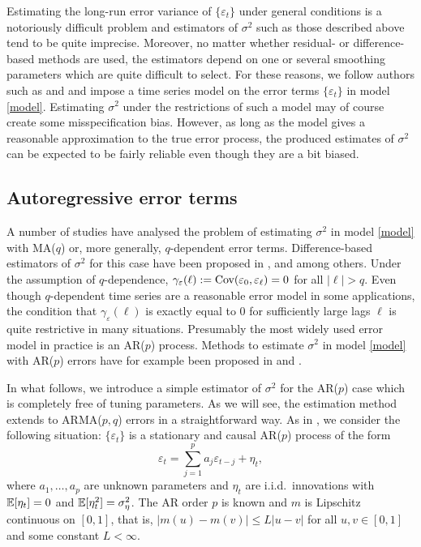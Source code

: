 Estimating the long-run error variance of $\{ \varepsilon_t \}$ under general conditions is a notoriously difficult problem and estimators of $\sigma^2$ such as those described above tend to be quite imprecise. Moreover, no matter whether residual- or difference-based methods are used, the estimators depend on one or several smoothing parameters which are quite difficult to select. For these reasons, we follow authors such as \cite{Hart1991, Hart1994} and \cite{Hall2003} and impose a time series model on the error terms $\{\varepsilon_t\}$ in model \eqref{model}. Estimating $\sigma^2$ under the restrictions of such a model may of course create some misspecification bias. However, as long as the model gives a reasonable approximation to the true error process, the produced estimates of $\sigma^2$ can be expected to be fairly reliable even though they are a bit biased. 


\subsection{Autoregressive error terms}\label{subsec-error-var-ar}


A number of studies have analysed the problem of estimating $\sigma^2$ in model \eqref{model} with MA($q$) or, more generally, $q$-dependent error terms. Difference-based estimators of $\sigma^2$ for this case have been proposed in \cite{MuellerStadtmueller1988}, \cite{Herrmann1992} and \cite{Munk2017} among others. Under the assumption of $q$-dependence, $\gamma_\varepsilon(\ell) := \textnormal{Cov}(\varepsilon_0,\varepsilon_{\ell}) = 0$ for all $|\ell| > q$. Even though $q$-dependent time series are a reasonable error model in some applications, the condition that $\gamma_\varepsilon(\ell)$ is exactly equal to $0$ for sufficiently large lags $\ell$ is quite restrictive in many situations. Presumably the most widely used error model in practice is an AR($p$) process. Methods to estimate $\sigma^2$ in model \eqref{model} with AR($p$) errors have for example been proposed in \cite{Hall2003} and \cite{ShaoYang2011}. 


In what follows, we introduce a simple estimator of $\sigma^2$ for the AR($p$) case which is completely free of tuning parameters. As we will see, the estimation method extends to ARMA($p,q$) errors in a straightforward way. As in \cite{Hall2003}, we consider the following situation: $\{\varepsilon_t\}$ is a stationary and causal AR($p$) process of the form 
\begin{equation}\label{AR-errors} 
\varepsilon_t = \sum_{j=1}^p a_j \varepsilon_{t-j} + \eta_t, 
\end{equation} 
where $a_1,\ldots,a_p$ are unknown parameters and $\eta_t$ are i.i.d.\ innovations with $\mathbb{E}[\eta_t] = 0$ and $\mathbb{E}[\eta_t^2] = \sigma_\eta^2$. The AR order $p$ is known and $m$ is Lipschitz continuous on $[0,1]$, that is, $|m(u) - m(v)| \le L|u-v|$ for all $u,v \in [0,1]$ and some constant $L < \infty$. 


